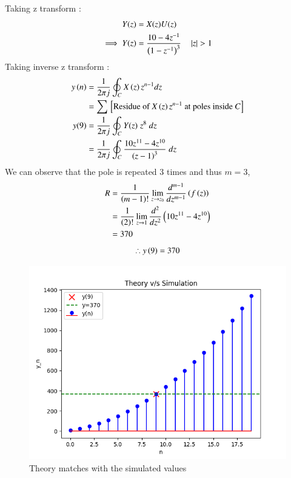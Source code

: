 \documentclass[journal,12pt,twocolumn]{IEEEtran}
\theoremstyle{remark}
\begin{document}
Taking z transform :
\begin{align}
    Y(z) &= X(z) U(z)\\
    \implies Y(z) &=\frac{10-4z^{-1}}{\left(1-z^{-1}\right)^3} \quad \left\vert z\right\vert > 1
\end{align}
Taking inverse z transform :
\begin{align}
    y\left(n\right) & =  \frac{1}{2\pi j} \oint_C X\left(z\right) z^{n-1} dz  \\
              & = \sum {}\left[\text{Residue of } X\left(z\right) z^{n-1} \text{ at poles inside } C\right]\\
    y(9)&=\frac{1}{2\pi j}\oint_{C}Y(z) \;z^{8} \;dz  \\
    &=\frac{1}{2\pi j}\oint_{C}\frac{10z^{11}-4z^{10}}{{\left(z-1\right)}^{3}} \;dz 
\end{align}
We can observe that the pole is repeated $3$ times and thus $m=3$,
\begin{align}
    R&=\frac{1}{\left(m-1\right)!}\lim\limits_{z\to z_{0}}\frac{d^{m-1}}{dz^{m-1}}\left(f\left(z\right)\right)  \\
    &=\frac{1}{\left(2\right)!}\lim\limits_{z\to 1}\frac{d^{2}}{dz^{2}}\left(10z^{11}-4z^{10}\right) \\
    &=370
\end{align}
\begin{align}
    \therefore y\left(9\right)=370
\end{align}


\begin{figure}[H]
    \includegraphics[width=1\columnwidth]{figs/Ncert_10.5.3.20stemplot.png}
    \caption{Theory matches with the simulated values}
    \label{fig:plot10.5.3.20}
\end{figure}
\end{document}
